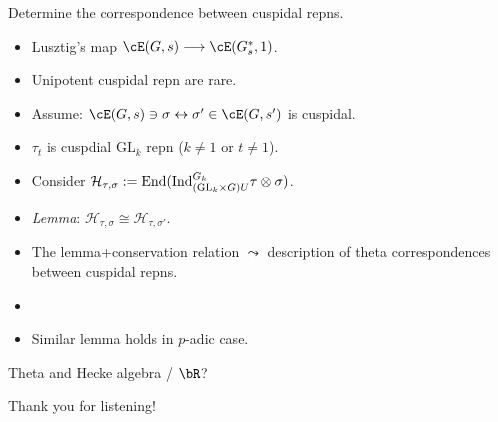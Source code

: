 \documentclass[t,mathserif,11pt,usenames,dvipsnames]{beamer}
\theoremstyle{plain}
\theoremstyle{definition}
\def\GL{\mathrm{GL}}
\def\End{{\rm End}}
\def\Ind{{\rm Ind}}
\def\blue{\color{blue}}
\let\oldemph\emph
\def\emph#1{\oldemph{\blue #1}}
\def\cH{\mathcal{H}}
\begin{document}
\begin{frame}{Determine the correspondence between cuspidal repns.}
  \begin{itemize}
    \item Lusztig's map
          $\cE(G,s)\longrightarrow \cE(G^{*}_{s},1)$.
    \item Unipotent cuspidal repn are rare. \pause
    \item Assume: $\cE(G,s) \ni\sigma\leftrightarrow \sigma'\in \cE(G,s')$ is
          cuspidal.
    \item $\tau_{t}$ is cuspdial $\GL_{k}$ repn ($k\neq 1$ or $t\neq 1$).
    \item Consider
          $\cH_{\tau,\sigma}:= \End(\Ind_{(\GL_{k}\times G)U}^{G_{k}} \tau \otimes \sigma)$. \pause
    \item \emph{Lemma}: $\cH_{\tau,\sigma}\cong \cH_{\tau,\sigma'}$.\pause
    \item The lemma+conservation relation $\leadsto$ description of theta
          correspondences between cuspidal repns.
    \item[]
    \item Similar lemma holds in $p$-adic case.
  \end{itemize}
\end{frame}

\begin{frame}{Theta and Hecke algebra / $\bR$?}
  \ \vspace{5em}
  \begin{center}
    \Huge Thank you for listening!
  \end{center}
\end{frame}


\def\VV{{\mathbb{V}}}
\def\tcNV{{\widetilde\cN}_\VV}
\def\tcN{{\widetilde{\cN}}}
\def\Flag{{\mathrm{Fl}}}
\end{document}
